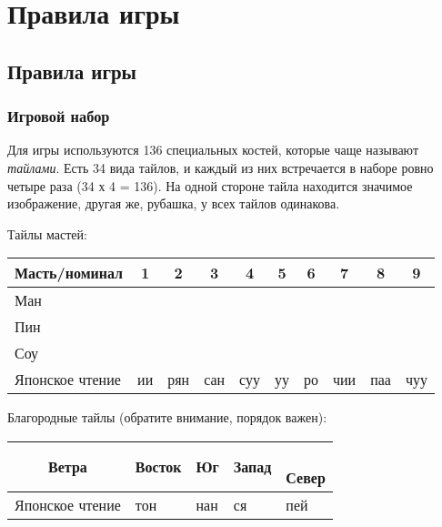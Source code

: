 \chapter{Правила игры}

\section{Правила игры}

\subsection{Игровой набор}

Для игры используются 136 специальных костей, которые чаще называют \textit{тайлами}. Есть 34 вида тайлов, и каждый из них встречается в наборе ровно четыре раза (34 х 4 = 136). На одной стороне тайла находится значимое изображение, другая же, рубашка, у всех тайлов одинакова.

Тайлы мастей:

\begin{tabular}{ |C{3.5cm}|c|c|c|c|c|c|c|c|c| } 
	\hline
	Масть/номинал & 1 & 2 & 3 & 4 & 5 & 6 & 7 & 8 & 9 \\
	\hline
	Ман \newline &  &  &  &  &  &  &  &  &  \rule[1ex]{0pt}{5ex} \\
	\hline
	Пин \newline &  &  &  &  &  &  &  &  &  \rule[1ex]{0pt}{5ex} \\
	\hline
	Соу \newline &  &  &  &  &  &  &  &  &  \rule[1ex]{0pt}{5ex} \\
	\hline
	Японское чтение & ии & рян & сан & суу & уу & ро & чии & паа & чуу \\
	\hline 
\end{tabular}


Благородные тайлы (обратите внимание, порядок важен):

\begin{tabular}{ |c|C{2cm}|C{2cm}|C{2cm}|C{2cm}| } 
	\hline
	 \rule[0ex]{0pt}{6ex} Ветра &  \newline Восток &  \newline Юг &  \newline Запад & { \newline Север} \\
	\hline
	Японское чтение & тон & нан & ся & пей \\
	\hline
\end{tabular}

